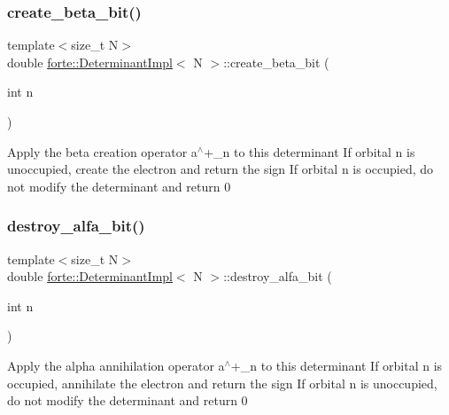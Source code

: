 \subsubsection{\texorpdfstring{create\+\_\+beta\+\_\+bit()}{create\_beta\_bit()}}
{\footnotesize\ttfamily template$<$size\+\_\+t N$>$ \\
double \mbox{\hyperlink{classforte_1_1_determinant_impl}{forte\+::\+Determinant\+Impl}}$<$ N $>$\+::create\+\_\+beta\+\_\+bit (\begin{DoxyParamCaption}\item[{int}]{n }\end{DoxyParamCaption})\hspace{0.3cm}{\ttfamily [inline]}}

Apply the beta creation operator a$^\wedge$+\+\_\+n to this determinant If orbital n is unoccupied, create the electron and return the sign If orbital n is occupied, do not modify the determinant and return 0 \mbox{\label{classforte_1_1_determinant_impl_a01c1ef1e7f640bc18a3e6fa18116d848}} 
\subsubsection{\texorpdfstring{destroy\+\_\+alfa\+\_\+bit()}{destroy\_alfa\_bit()}}
{\footnotesize\ttfamily template$<$size\+\_\+t N$>$ \\
double \mbox{\hyperlink{classforte_1_1_determinant_impl}{forte\+::\+Determinant\+Impl}}$<$ N $>$\+::destroy\+\_\+alfa\+\_\+bit (\begin{DoxyParamCaption}\item[{int}]{n }\end{DoxyParamCaption})\hspace{0.3cm}{\ttfamily [inline]}}

Apply the alpha annihilation operator a$^\wedge$+\+\_\+n to this determinant If orbital n is occupied, annihilate the electron and return the sign If orbital n is unoccupied, do not modify the determinant and return 0 \mbox{\label{classforte_1_1_determinant_impl_ad19fd82d5428c19620d44868984fbd32}} 
